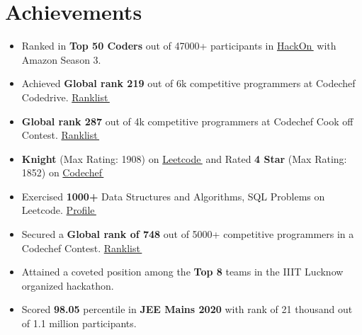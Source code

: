 \documentclass[letterpaper,11pt]{article}
\let\orighref\href
\renewcommand{\href}[2]{\orighref{#1}{#2\,\faExternalLink}}
\begin{document}
\section{Achievements}
\smallskip
\begin{itemize}[noitemsep]
\item{
   {
   Ranked in \textbf{Top 50 Coders} out of 47000+ participants in \href{https://docs.google.com/spreadsheets/d/e/2PACX-1vRyP-Xle6mZUD6hrYjNmPc0nf_VXc0v7yKkenwl29oK_r0iqtBGQf8GBIm1HUSEAtCCmqxtFT9Ak3oo/pubhtml}{HackOn} with Amazon Season 3. 
   }
}
  \item{
     { Achieved \textbf{Global rank 219} out of 6k competitive programmers at Codechef Codedrive. \href{https://www.codechef.com/rankings/CDRV21C?itemsPerPage=100&order=asc&page=64&sortBy=rank}{Ranklist}}
  }
  \item{ 
     {\textbf{Global rank 287} out of 4k competitive programmers at Codechef Cook off Contest. \href{https://www.codechef.com/rankings/CDRV21C?itemsPerPage=100&order=asc&page=64&sortBy=rank}{ Ranklist}}
  }
  
  \item{
  \textbf{Knight} (Max Rating: 1908) on \href{https://leetcode.com/shankar999/}{Leetcode} and 
     {Rated\textbf{ 4 Star} (Max Rating: 1852) on  \href{https://www.codechef.com/users/shankar999}{Codechef}}
  }
  \item{
     {Exercised \textbf{1000+} Data Structures and Algorithms, SQL Problems on Leetcode. \href{https://leetcode.com/shankar999/}{ Profile}}
  }
  \item{
     {Secured a \textbf{Global rank of 748} out of 5000+ competitive programmers in a Codechef Contest. \href{https://www.codechef.com/rankings/COOK137B?itemsPerPage=100&order=asc&page=47&sortBy=rank}{ Ranklist}}
  }
  \item {
  Attained a coveted position among the \textbf{Top 8} teams in the IIIT Lucknow organized hackathon.
  }
  \item{
  Scored \textbf{98.05} percentile in \textbf{JEE Mains 2020}  with rank of 21 thousand out of 1.1 million participants.
  }
 
\end{itemize}

\end{document}
